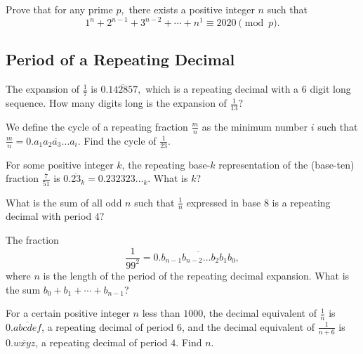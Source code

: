 \documentclass[mast]{lucky}
\begin{document}
\begin{prob}[USEMO 2019/4]{13}
Prove that for any prime $p,$ there exists a positive integer $n$ such that
\[1^n+2^{n-1}+3^{n-2}+\cdots+n^1\equiv 2020\pmod{p}.\]
\end{prob}

\subsection{Period of a Repeating Decimal}
\begin{prob}[]{2}
The expansion of $\frac{1}{7}$ is $0.\overline{142857},$ which is a repeating decimal with a $6$ digit long sequence. How many digits long is the expansion of $\frac{1}{13}?$
\end{prob}

\begin{prob}[]{3}
We define the cycle of a repeating fraction $\tfrac{m}{n}$ as the minimum number $i$ such that $\tfrac{m}{n} = 0.\overline{a_1a_2a_3\dots a_i}$. Find the cycle of $\tfrac{1}{23}$.
\end{prob}

\begin{prob}[AMC 10A 2019/18]{3}
For some positive integer $k$, the repeating base-$k$ representation of the (base-ten) fraction $\frac{7}{51}$ is $0.\overline{23}_k = 0.232323\ldots_k$. What is $k$?
\end{prob}

\begin{req}{4}
What is the sum of all odd $n$ such that $\frac{1}{n}$ expressed in base $8$ is a repeating decimal with period $4?$
\end{req}

\begin{prob}[AMC 12A 2014/23]{6}
The fraction\[\dfrac1{99^2}=0.\overline{b_{n-1}b_{n-2}\ldots b_2b_1b_0},\]where $n$ is the length of the period of the repeating decimal expansion. What is the sum $b_0+b_1+\cdots+b_{n-1}$?
\end{prob}

\begin{prob}[AMC 12B 2016/22]{6}
For a certain positive integer $n$ less than $1000$, the decimal equivalent of $\frac{1}{n}$ is $0.\overline{abcdef}$, a repeating decimal of period $6$, and the decimal equivalent of $\frac{1}{n+6}$ is $0.\overline{wxyz}$, a repeating decimal of period $4$. Find $n.$
\end{prob}
\end{document}

